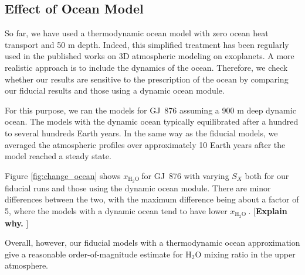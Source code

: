 \documentclass[11pt,numberedappendix,twocolappendix,]{emulateapj}
\def\water{H$_2$O }
\def\xwater{\dsa{$x_\text{\water}$}}
\def\memo#1{\color{red}$[${\bf #1}$]$ \color{black}}
\newcommand{\dsa}[1]{{\color{blue}#1}}
\begin{document}
\subsection{Effect of Ocean Model}
\label{ss:sensitivity_ocean}


So far, we have used a thermodynamic ocean model with zero ocean heat transport and 50 m depth. 
Indeed, this simplified treatment has been regularly used in the published works on 3D atmospheric modeling on exoplanets. 
A more realistic approach is to include the dynamics of the ocean. 
Therefore, we check whether our results are sensitive to the prescription of the ocean by comparing our fiducial results and those using a dynamic ocean module. 

For this purpose, we ran the models for GJ~876 assuming a 900 m deep dynamic ocean. 
The models with the dynamic ocean typically equilibrated after a hundred to several hundreds Earth years. 
In the same way as the fiducial models, we averaged the atmospheric profiles  over approximately 10 Earth years after the model reached a steady state. 

Figure \ref{fig:change_ocean} shows \xwater for GJ~876 with varying $S_X$ both for our fiducial runs and those using the dynamic ocean module.  
There are minor differences between the two, with the maximum difference being about a factor of 5, where the models with a dynamic ocean tend to have lower \xwater. 
\memo{Explain why. }

Overall, however, our fiducial models with a thermodynamic ocean approximation give a reasonable order-of-magnitude estimate for \water mixing ratio in the upper atmosphere. 
\end{document}
